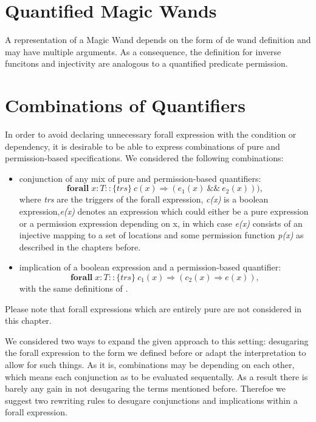 \documentclass[12pt]{article}
\begin{document}
\section{Quantified Magic Wands}
A representation of a Magic Wand\cite{magicwand} depends on the form of de wand definition and may have multiple arguments. As a consequence, the definition for inverse funcitons and injectivity are analogous to a quantified predicate permission.


\section{Combinations of Quantifiers}
In order to avoid declaring unnecessary forall expression with the condition or dependency, it is desirable to be able to express combinations of pure and permission-based specifications. We considered the following combinations:
\begin{itemize}
\item conjunction of any mix of pure and permission-based quantifiers:
\begin{equation}
	\mathbf{forall} \; x:T :: \{trs\}\  c(x) \Rightarrow (e_1(x)\ \&\& \ e_2(x))),
\end{equation}
where {\it trs} are the triggers of the forall expression, {\it c(x)} is  a boolean expression,{\it e(x)} denotes an expression which could either be a pure expression or a permission expression depending on x, in which case {\it e(x)} consists of an injective mapping to a set of locations and some permission function {\it p(x)} as described in the chapters before.

\item implication of a boolean expression and a permission-based quantifier:
\begin{equation}
	\mathbf{forall} \; x:T ::  \{trs\}\ c_1(x) \Rightarrow (c_2(x) \Rightarrow e(x)),
\end{equation}
with the same definitions of .
\end{itemize}

Please note that forall expressions which are entirely pure are not considered in this chapter.


We considered two ways to expand the given approach to this setting: desugaring the forall expression to the form we defined before or adapt the interpretation to allow for such things. As it is, combinations may be depending on each other, which means each conjunction as to be evaluated sequentally. As a result there is barely any gain in not desugaring the terms mentioned before. Therefoe we suggest two rewriting rules to desugare conjunctions and implications within a forall expression.
\end{document}
